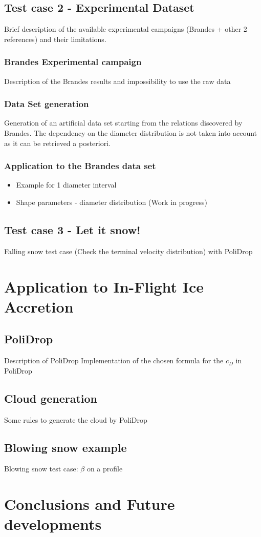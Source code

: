 \documentclass[a4paper,12pt,twoside,titlepage,openright]{book}
\begin{document}
	\section{Test case 2 - Experimental Dataset}
		Brief description of the available experimental campaigns (Brandes + other 2 references) and their limitations.
	
		\subsection{Brandes Experimental campaign}
		Description of the Brandes results and impossibility to use the raw data
		
		\subsection{Data Set generation}
		Generation of an artificial data set starting from the relations discovered by Brandes. The dependency on the diameter distribution is not taken into account as it can be retrieved a posteriori.
	
		\subsection{Application to the Brandes data set}
		\begin{itemize}
			\item Example for 1 diameter interval
			\item Shape parameters - diameter distribution (Work in progress)
		\end{itemize}
		
	\section{Test case 3 - Let it snow!}
		Falling snow test case (Check the terminal velocity distribution) with PoliDrop
	
	
\chapter{Application to In-Flight Ice Accretion}
	\section{PoliDrop}
	Description of PoliDrop
	Implementation of the chosen formula for the $ c_D $ in PoliDrop
	
	\section{Cloud generation}
		Some rules to generate the cloud by PoliDrop
		
	\section{Blowing snow example}
		Blowing snow test case: $\beta$ on a profile


\chapter{Conclusions and Future developments}

	
\printbibliography[heading=bibintoc]
\end{document}
